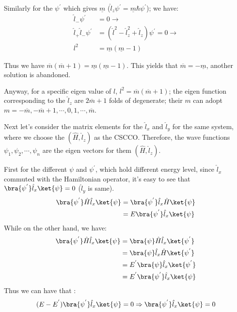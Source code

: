 Similarly for the $\psi^{'}$ which gives $\underline{m}$
($\hat{l}_{z}\psi^{'} = \underline{m}\hbar\psi^{'}$); we have:
\begin{align}\label{}
\hat{l}_{-}\psi^{'} &= 0 \rightarrow \nonumber \\
\hat{l}_{+}\hat{l}_{-}\psi^{'}
&=(\hat{l}^{2}-\hat{l}_{z}^{2}+\hat{l}_{z})\psi^{'}= 0 \rightarrow \nonumber \\
l^{2} &= \underline{m}(\underline{m}-1)
\end{align}

Thus we have $\overline{m}(\overline{m}+1) =
\underline{m}(\underline{m}-1)$. This yields that $\overline{m} =-
\underline{m}$, another solution is abandoned.

Anyway, for a specific eigen value of $l$, $l^{2} =
\overline{m}(\overline{m}+1)$; the eigen function corresponding to
the $\hat{l}_{z}$ are $2\overline{m}+1$ folds of degenerate; their
$m$ can adopt $m=-\overline{m}, -\overline{m}+1, \cdots, 0, 1,
\cdots, \overline{m}$.

Next let's consider the matrix elements for the $\hat{l}_{x}$ and
$\hat{l}_{y}$ for the same system, where we choose the
$(\hat{H},\hat{l}_{z})$ as the CSCCO. Therefore, the wave functions
$\psi_{1}, \psi_{2}, \cdots, \psi_{n}$ are the eigen vectors for
them $(\hat{H},\hat{l}_{z})$.

First for the different $\psi$ and $\psi^{'}$, which hold different
energy level, since $\hat{l}_{x}$ commuted with the Hamiltonian
operator, it's easy to see that $\bra{\psi^{'}}\hat{l}_{x}\ket{\psi}
= 0$ ($\hat{l}_{y}$ is same).
\begin{align}\label{}
\bra{\psi^{'}}\hat{H}\hat{l}_{x}\ket{\psi} &=
\bra{\psi^{'}}\hat{l}_{x}\hat{H}\ket{\psi} \nonumber \\
&=E\bra{\psi^{'}}\hat{l}_{x}\ket{\psi}
\end{align}
While on the other hand, we have:
\begin{align}\label{}
\bra{\psi^{'}}\hat{H}\hat{l}_{x}\ket{\psi} &=
\bra{\psi}\hat{H}\hat{l}_{x}\ket{\psi^{'}} \nonumber \\
&=\bra{\psi}\hat{l}_{x}\hat{H}\ket{\psi^{'}} \nonumber \\
&=E^{'}\bra{\psi}\hat{l}_{x}\ket{\psi^{'}} \nonumber \\
&=E^{'}\bra{\psi^{'}}\hat{l}_{x}\ket{\psi}
\end{align}
Thus we can have that :
\begin{equation}\label{}
(E-E^{'})\bra{\psi^{'}}\hat{l}_{x}\ket{\psi} = 0 \Rightarrow
\bra{\psi^{'}}\hat{l}_{x}\ket{\psi} = 0
\end{equation}

